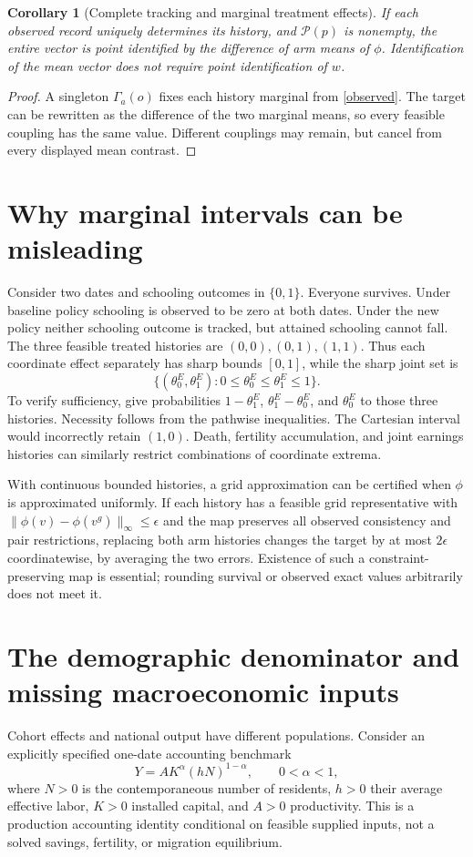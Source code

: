\documentclass[11pt]{article}
\newtheorem{corollary}[theorem]{Corollary}
\theoremstyle{remark}
\begin{document}
\begin{corollary}[Complete tracking and marginal treatment effects]
If each observed record uniquely determines its history, and $\mathcal P(p)$ is nonempty, the entire vector is point identified by the difference of arm means of $\phi$. Identification of the mean vector does not require point identification of $w$.
\end{corollary}
\begin{proof}
A singleton $\Gamma_a(o)$ fixes each history marginal from \eqref{observed}. The target can be rewritten as the difference of the two marginal means, so every feasible coupling has the same value. Different couplings may remain, but cancel from every displayed mean contrast.
\end{proof}

\section{Why marginal intervals can be misleading}
Consider two dates and schooling outcomes in $\{0,1\}$. Everyone survives. Under baseline policy schooling is observed to be zero at both dates. Under the new policy neither schooling outcome is tracked, but attained schooling cannot fall. The three feasible treated histories are $(0,0),(0,1),(1,1)$. Thus each coordinate effect separately has sharp bounds $[0,1]$, while the sharp joint set is
\[
 \{(\theta^E_0,\theta^E_1):0\leq\theta^E_0\leq\theta^E_1\leq1\}.
\]
To verify sufficiency, give probabilities $1-\theta^E_1$, $\theta^E_1-\theta^E_0$, and $\theta^E_0$ to those three histories. Necessity follows from the pathwise inequalities. The Cartesian interval would incorrectly retain $(1,0)$. Death, fertility accumulation, and joint earnings histories can similarly restrict combinations of coordinate extrema.

With continuous bounded histories, a grid approximation can be certified when $\phi$ is approximated uniformly. If each history has a feasible grid representative with $\|\phi(v)-\phi(v^g)\|_\infty\leq\epsilon$ and the map preserves all observed consistency and pair restrictions, replacing both arm histories changes the target by at most $2\epsilon$ coordinatewise, by averaging the two errors. Existence of such a constraint-preserving map is essential; rounding survival or observed exact values arbitrarily does not meet it.

\section{The demographic denominator and missing macroeconomic inputs}
Cohort effects and national output have different populations. Consider an explicitly specified one-date accounting benchmark
\[
 Y=A K^\alpha(hN)^{1-\alpha},\qquad 0<\alpha<1,
\]
where $N>0$ is the contemporaneous number of residents, $h>0$ their average effective labor, $K>0$ installed capital, and $A>0$ productivity. This is a production accounting identity conditional on feasible supplied inputs, not a solved savings, fertility, or migration equilibrium.
\end{document}
